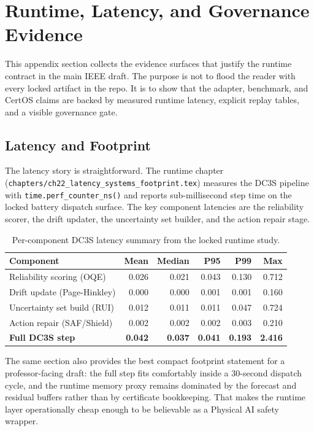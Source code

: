 \section{Runtime, Latency, and Governance Evidence}
\label{app:prof-runtime-evidence}

This appendix section collects the evidence surfaces that justify the
runtime contract in the main IEEE draft.  The purpose is not to flood the
reader with every locked artifact in the repo.  It is to show that the
adapter, benchmark, and CertOS claims are backed by measured runtime
latency, explicit replay tables, and a visible governance gate.

\subsection{Latency and Footprint}
The latency story is straightforward.  The runtime chapter
(\texttt{chapters/ch22\_latency\_systems\_footprint.tex}) measures the DC3S
pipeline with \texttt{time.perf\_counter\_ns()} and reports sub-millisecond
step time on the locked battery dispatch surface.  The key component
latencies are the reliability scorer, the drift updater, the uncertainty
set builder, and the action repair stage.

\begin{table}[t]
\centering
\caption{Per-component DC3S latency summary from the locked runtime study.}
\label{tab:prof-latency-summary}
\begin{tabular}{lrrrrr}
\toprule
\textbf{Component} & \textbf{Mean} & \textbf{Median} & \textbf{P95} & \textbf{P99} & \textbf{Max} \\
\midrule
Reliability scoring (OQE)   & 0.026 & 0.021 & 0.043 & 0.130 & 0.712 \\
Drift update (Page-Hinkley) & 0.000 & 0.000 & 0.001 & 0.001 & 0.160 \\
Uncertainty set build (RUI) & 0.012 & 0.011 & 0.011 & 0.047 & 0.724 \\
Action repair (SAF/Shield)  & 0.002 & 0.002 & 0.002 & 0.003 & 0.210 \\
\midrule
\textbf{Full DC3S step}     & \textbf{0.042} & \textbf{0.037} & \textbf{0.041} & \textbf{0.193} & \textbf{2.416} \\
\bottomrule
\end{tabular}
\end{table}

The same section also provides the best compact footprint statement for a
professor-facing draft: the full step fits comfortably inside a 30-second
dispatch cycle, and the runtime memory proxy remains dominated by the
forecast and residual buffers rather than by certificate bookkeeping.
That makes the runtime layer operationally cheap enough to be believable
as a Physical AI safety wrapper.

